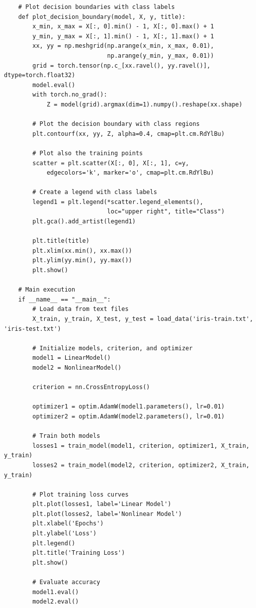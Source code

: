 \documentclass[11pt, oneside]{article}   	%
\begin{document}
\begin{verbatim}
    # Plot decision boundaries with class labels
    def plot_decision_boundary(model, X, y, title):
        x_min, x_max = X[:, 0].min() - 1, X[:, 0].max() + 1
        y_min, y_max = X[:, 1].min() - 1, X[:, 1].max() + 1
        xx, yy = np.meshgrid(np.arange(x_min, x_max, 0.01),
                             np.arange(y_min, y_max, 0.01))
        grid = torch.tensor(np.c_[xx.ravel(), yy.ravel()], dtype=torch.float32)
        model.eval()
        with torch.no_grad():
            Z = model(grid).argmax(dim=1).numpy().reshape(xx.shape)
        
        # Plot the decision boundary with class regions
        plt.contourf(xx, yy, Z, alpha=0.4, cmap=plt.cm.RdYlBu)
        
        # Plot also the training points
        scatter = plt.scatter(X[:, 0], X[:, 1], c=y, 
            edgecolors='k', marker='o', cmap=plt.cm.RdYlBu)
        
        # Create a legend with class labels
        legend1 = plt.legend(*scatter.legend_elements(),
                             loc="upper right", title="Class")
        plt.gca().add_artist(legend1)
        
        plt.title(title)
        plt.xlim(xx.min(), xx.max())
        plt.ylim(yy.min(), yy.max())
        plt.show()
    
    # Main execution
    if __name__ == "__main__":
        # Load data from text files
        X_train, y_train, X_test, y_test = load_data('iris-train.txt', 'iris-test.txt')
        
        # Initialize models, criterion, and optimizer
        model1 = LinearModel()
        model2 = NonlinearModel()
        
        criterion = nn.CrossEntropyLoss()
        
        optimizer1 = optim.AdamW(model1.parameters(), lr=0.01)
        optimizer2 = optim.AdamW(model2.parameters(), lr=0.01)
        
        # Train both models
        losses1 = train_model(model1, criterion, optimizer1, X_train, y_train)
        losses2 = train_model(model2, criterion, optimizer2, X_train, y_train)
        
        # Plot training loss curves
        plt.plot(losses1, label='Linear Model')
        plt.plot(losses2, label='Nonlinear Model')
        plt.xlabel('Epochs')
        plt.ylabel('Loss')
        plt.legend()
        plt.title('Training Loss')
        plt.show()
        
        # Evaluate accuracy
        model1.eval()
        model2.eval()
        

\end{verbatim}
\end{document}
